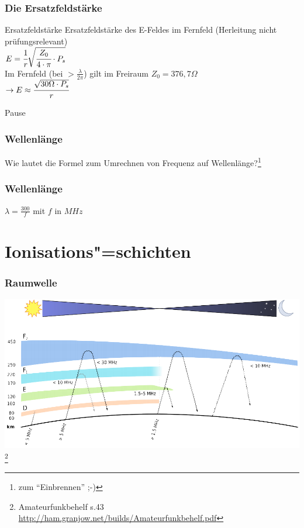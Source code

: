 \begin{frame}
    \frametitle{Die Ersatzfeldstärke}
    \begin{block}{Ersatzfeldstärke}
        Ersatzfeldstärke des E-Feldes im Fernfeld (Herleitung nicht prüfungsrelevant)\\[1em]
    	$E = \cfrac{1}{r} \sqrt{\cfrac{Z_0}{4 \cdot \pi} \cdot P_s}$ \\[1em]
        Im Fernfeld (bei $> \frac{\lambda}{2\pi}$) gilt im Freiraum $Z_0 = 376,7 \Omega $\\[1em]
    	$\rightarrow E \approx \cfrac{\sqrt{30 \Omega \cdot P_s}}{r} $ \\[1em]
  \end{block}
\end{frame}

\begin{frame}
    \begin{center}
        \Huge Pause
    \end{center}
\end{frame}

\begin{frame}
    \frametitle{Wellenlänge}
    \begin{center}
        \huge Wie lautet die Formel zum Umrechnen von Frequenz auf
        Wellenlänge?\footnote{zum ``Einbrennen'' ;-)}
    \end{center}
\end{frame}

\begin{frame}
    \frametitle{Wellenlänge}
    \begin{center}
        \huge $\lambda = \frac{300}{f}$ mit $f$ in $MHz$
    \end{center}
\end{frame}

\section*{Ionisations"=schichten}

\begin{frame}
    \frametitle{Raumwelle}
	\begin{center}
        \includegraphics[width=.9\textwidth,height=.85\textheight,keepaspectratio]{a08/schichten_behelf_43.png}
        \footnote{\tiny Amateurfunkbehelf s.43 \url{http://ham.granjow.net/builds/Amateurfunkbehelf.pdf}}
    \end{center}
\end{frame}

